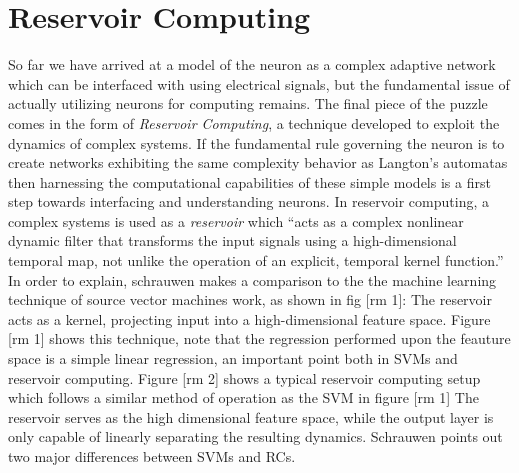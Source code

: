 \section{Reservoir Computing}
So far we have arrived at a model of the neuron as a complex adaptive network
which can be interfaced with using electrical signals, but the fundamental issue
of actually utilizing neurons for computing remains.
%
The final piece of the puzzle comes in the form of \emph{Reservoir Computing}, a
technique developed to exploit the dynamics of complex systems.
If the fundamental rule governing the neuron is to create networks exhibiting
the same complexity behavior as Langton's automatas then harnessing the
computational capabilities of these simple models is a first step towards
interfacing and understanding neurons.
%
In reservoir computing, a complex systems is used as a \textit{reservoir}
\cite{schrauwen_overview_2007} which
``acts as a complex nonlinear dynamic filter that transforms the
input signals using a high-dimensional temporal map, not unlike the operation
of an explicit, temporal kernel function.''\\
In order to explain, schrauwen makes a comparison to the the machine learning
technique of source vector machines work, as shown in fig [rm 1]:
The reservoir acts as a kernel, projecting input into a high-dimensional feature space.
Figure [rm 1] shows this technique, note that the regression performed upon the
feauture space is a simple linear regression, an important point both in SVMs
and reservoir computing.
%
Figure [rm 2] shows a typical reservoir computing setup which follows a similar
method of operation as the SVM in figure [rm 1]
The reservoir serves as the high dimensional feature space, while the output
layer is only capable of linearly separating the resulting dynamics.
%
Schrauwen points out two major differences between SVMs and RCs.
